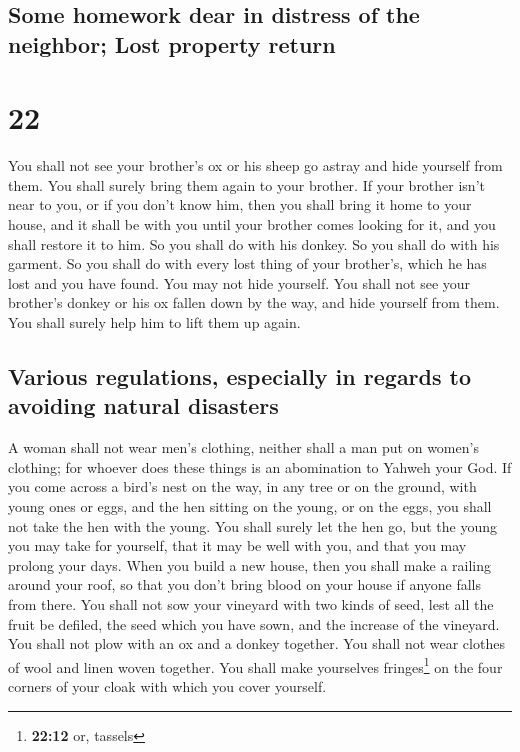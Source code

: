 \hypertarget{some-homework-dear-in-distress-of-the-neighbor-lost-property-return}{%
\subsection{Some homework dear in distress of the neighbor; Lost
property
return}\label{some-homework-dear-in-distress-of-the-neighbor-lost-property-return}}

\hypertarget{section-21}{%
\section{22}\label{section-21}}

 You shall not see your brother's ox or his sheep go
astray and hide yourself from them. You shall surely bring them again to
your brother.  If your brother isn't near to you, or if
you don't know him, then you shall bring it home to your house, and it
shall be with you until your brother comes looking for it, and you shall
restore it to him.  So you shall do with his donkey. So
you shall do with his garment. So you shall do with every lost thing of
your brother's, which he has lost and you have found. You may not hide
yourself.  You shall not see your brother's donkey or his
ox fallen down by the way, and hide yourself from them. You shall surely
help him to lift them up again.

\hypertarget{various-regulations-especially-in-regards-to-avoiding-natural-disasters}{%
\subsection{Various regulations, especially in regards to avoiding
natural
disasters}\label{various-regulations-especially-in-regards-to-avoiding-natural-disasters}}

 A woman shall not wear men's clothing, neither shall a
man put on women's clothing; for whoever does these things is an
abomination to Yahweh your God.  If you come across a
bird's nest on the way, in any tree or on the ground, with young ones or
eggs, and the hen sitting on the young, or on the eggs, you shall not
take the hen with the young.  You shall surely let the hen
go, but the young you may take for yourself, that it may be well with
you, and that you may prolong your days.  When you build a
new house, then you shall make a railing around your roof, so that you
don't bring blood on your house if anyone falls from there.
 You shall not sow your vineyard with two kinds of seed,
lest all the fruit be defiled, the seed which you have sown, and the
increase of the vineyard.  You shall not plow with an ox
and a donkey together.  You shall not wear clothes of
wool and linen woven together.  You shall make yourselves
fringes\footnote{\textbf{22:12} or, tassels} on the four corners of your
cloak with which you cover yourself.

